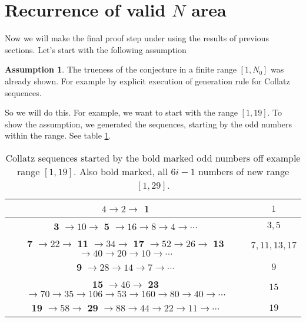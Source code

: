 \documentclass{aomart}
\theoremstyle{definition}
\newtheorem{ass}{Assumption}
\begin{document}
\section{Recurrence of valid $N$ area}
\label{s:itofN}
Now we will make the final proof step under using the results of previous sections. Let's start with the following assumption
\begin{ass}\label{ass:finalass}
The trueness of the conjecture in a finite range $[1,N_{0}]$ was already shown. For example by explicit execution of generation rule for Collatz sequences. 
\end{ass}
So we will do this. For example, we want to start with the range $[1,19]$. To show the assumption, we generated the sequences, starting by the odd numbers within the range. See table \ref{tab:assumpt}.
\begin{table}%
\centering
\begin{tabular}{|c|c|}
\hline $4 \rightarrow 2 \rightarrow$ \textbf{1} & $1$ \\ 
\hline \textbf{3} $\rightarrow 10 \rightarrow$ \textbf{5} $\rightarrow 16 \rightarrow 8 \rightarrow 4 \rightarrow \cdots$ & $3,5$ \\
\hline \textbf{7} $\rightarrow 22 \rightarrow$ \textbf{11} $\rightarrow 34 \rightarrow$ \textbf{17} $\rightarrow 52 \rightarrow 26 \rightarrow$ \textbf{13} $\rightarrow 40 \rightarrow 20 \rightarrow 10 \rightarrow \cdots$ & $7,11,13,17$ \\
\hline \textbf{9} $\rightarrow 28 \rightarrow 14 \rightarrow 7 \rightarrow \cdots$ & $9$ \\
\hline \textbf{15} $\rightarrow 46 \rightarrow$ \textbf{23} $\rightarrow 70 \rightarrow 35 \rightarrow 106 \rightarrow 53 \rightarrow 160 \rightarrow 80 \rightarrow 40 \rightarrow \cdots$ & $15$ \\
\hline \textbf{19} $\rightarrow 58 \rightarrow$ \textbf{29} $\rightarrow 88 \rightarrow 44 \rightarrow 22 \rightarrow 11 \rightarrow \cdots$ & $19$ \\
\hline 
\end{tabular}\caption{Collatz sequences started by the bold marked odd numbers off example range $[1,19]$. Also bold marked, all $6i-1$ numbers of new range $[1,29]$.}\label{tab:assumpt}\end{table}
\end{document}
